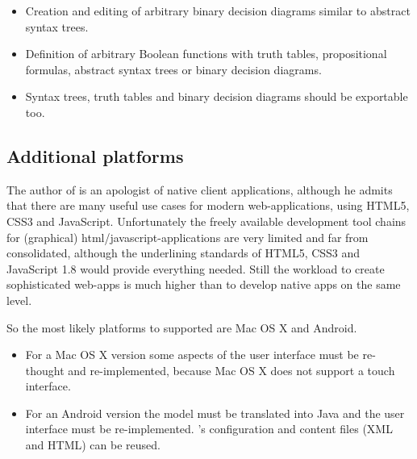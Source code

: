 \begin{itemize}

\item Creation and editing of arbitrary binary decision diagrams similar to abstract syntax trees.

\item Definition of arbitrary Boolean functions with truth tables, propositional formulas, abstract syntax trees or binary decision diagrams.

\item Syntax trees, truth tables and binary decision diagrams should be exportable too.

\end{itemize}


\subsection{Additional platforms}

The author of \Nyaya is an apologist of native client applications,
although he admits that there are many useful use cases for modern web-applications, 
using HTML5, CSS3 and JavaScript. 
Unfortunately the freely available development tool chains for (graphical) html/javascript-applications
are very limited and far from consolidated, although the underlining standards of HTML5, CSS3 
and JavaScript 1.8 would provide everything needed.
Still the workload to create sophisticated web-apps 
is much higher than to develop native apps on the same level.

So the most likely platforms to supported \Nyaya are Mac OS X and Android.

\begin{itemize}
\item
For a Mac OS X version some aspects of the user interface must be re-thought and re-implemented, 
because Mac OS X does not support a touch interface.
\item
For an Android version the model must be translated into Java and the user interface must be re-implemented.
{\Nyaya}’s configuration and content files (XML and HTML) can be reused.
\end{itemize}
